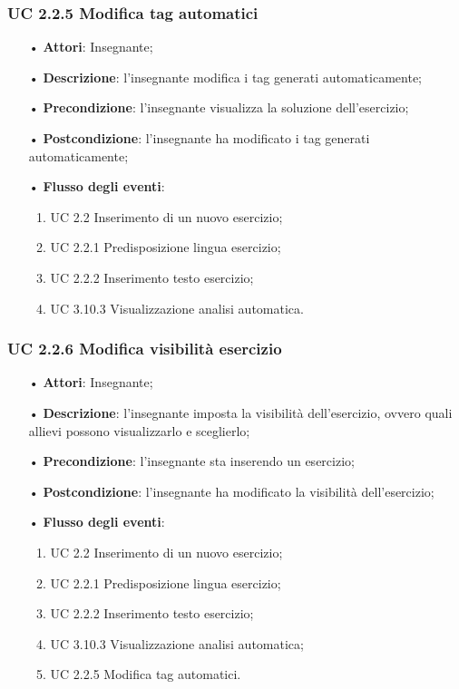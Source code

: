 \subsubsection{UC 2.2.5 Modifica tag automatici}
\begin{itemize}
	\item[•] \textbf{Attori}: Insegnante;
	\item[•] \textbf{Descrizione}: l’insegnante modifica i tag generati automaticamente;
	\item[•] \textbf{Precondizione}: l'insegnante visualizza la soluzione dell'esercizio;
	\item[•] \textbf{Postcondizione}: l'insegnante ha modificato i tag generati automaticamente;
	\item[•] \textbf{Flusso degli eventi}:
		\begin{enumerate}
		\item UC 2.2 Inserimento di un nuovo esercizio;
		\item UC 2.2.1 Predisposizione lingua esercizio;
		\item UC 2.2.2 Inserimento testo esercizio;
		\item UC 3.10.3  Visualizzazione analisi automatica.
	\end{enumerate}
\end{itemize}

\subsubsection{UC 2.2.6 Modifica visibilità esercizio}
\begin{itemize}
	\item[•] \textbf{Attori}: Insegnante;
	\item[•] \textbf{Descrizione}: l'insegnante imposta la visibilità dell'esercizio, ovvero quali allievi possono visualizzarlo e sceglierlo;
	\item[•] \textbf{Precondizione}: l'insegnante sta inserendo un esercizio;
	\item[•] \textbf{Postcondizione}: l'insegnante ha modificato la visibilità dell'esercizio;
	\item[•] \textbf{Flusso degli eventi}:
		\begin{enumerate}
		\item UC 2.2 Inserimento di un nuovo esercizio;
		\item UC 2.2.1 Predisposizione lingua esercizio;
		\item UC 2.2.2 Inserimento testo esercizio;
		\item UC 3.10.3  Visualizzazione analisi automatica;
		\item UC 2.2.5 Modifica tag automatici.
	\end{enumerate}
\end{itemize}


